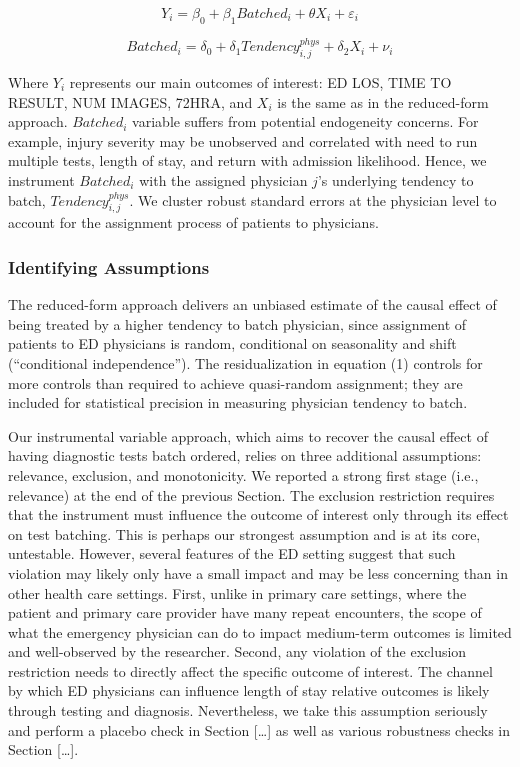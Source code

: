 \documentclass[,mnsc,nonblindrev]{informs}
\begin{document}
\begin{equation}
Y_i = \beta_0 + \beta_1 Batched_i + \theta X_i + \varepsilon_i
\end{equation}

\begin{equation}
Batched_i = \delta_0 + \delta_1 Tendency_{i,j}^{phys} + \delta_2 X_i + \nu_i
\end{equation}

Where \(Y_i\) represents our main outcomes of interest: ED LOS, TIME TO
RESULT, NUM IMAGES, 72HRA, and \(X_i\) is the same as in the
reduced-form approach. \(Batched_i\) variable suffers from potential
endogeneity concerns. For example, injury severity may be unobserved and
correlated with need to run multiple tests, length of stay, and return
with admission likelihood. Hence, we instrument \(Batched_i\) with the
assigned physician \(j\)'s underlying tendency to batch,
\(Tendency_{i,j}^{phys}\). We cluster robust standard errors at the
physician level to account for the assignment process of patients to
physicians.

\hypertarget{identifying-assumptions}{%
\subsubsection{Identifying Assumptions}\label{identifying-assumptions}}

\hfill\break
The reduced-form approach delivers an unbiased estimate of the causal
effect of being treated by a higher tendency to batch physician, since
assignment of patients to ED physicians is random, conditional on
seasonality and shift (``conditional independence''). The
residualization in equation (1) controls for more controls than required
to achieve quasi-random assignment; they are included for statistical
precision in measuring physician tendency to batch.

Our instrumental variable approach, which aims to recover the causal
effect of having diagnostic tests batch ordered, relies on three
additional assumptions: relevance, exclusion, and monotonicity. We
reported a strong first stage (i.e., relevance) at the end of the
previous Section. The exclusion restriction requires that the instrument
must influence the outcome of interest only through its effect on test
batching. This is perhaps our strongest assumption and is at its core,
untestable. However, several features of the ED setting suggest that
such violation may likely only have a small impact and may be less
concerning than in other health care settings. First, unlike in primary
care settings, where the patient and primary care provider have many
repeat encounters, the scope of what the emergency physician can do to
impact medium-term outcomes is limited and well-observed by the
researcher. Second, any violation of the exclusion restriction needs to
directly affect the specific outcome of interest. The channel by which
ED physicians can influence length of stay relative outcomes is likely
through testing and diagnosis. Nevertheless, we take this assumption
seriously and perform a placebo check in Section {[}\ldots{]} as well as
various robustness checks in Section {[}\ldots{]}.
\end{document}

